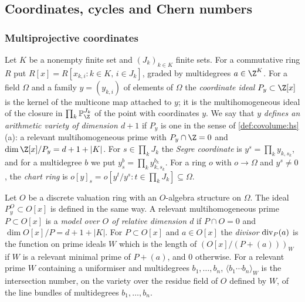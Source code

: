 \subsection{Coordinates, cycles and Chern numbers}\label{pf:towergeo:setting}

\subsubsection*{Multiprojective coordinates}
Let $K$ be a nonempty finite set and $(J_k)_{k\in K}$ finite sets. For a commutative ring $R$ put
$R[x]=R[x_{k,i}:k\in K,\,i\in J_k]$, graded by multidegrees $a\in\Z^K$. For a field $\Omega$ and a
family $y=(y_{k,i})$ of elements of $\Omega$ the \emph{coordinate ideal} $P_y\subset\Z[x]$ is the kernel
of the multicone map attached to $y$; it is the multihomogeneous ideal of the closure in
$\prod_k\mathbb P^{J_k}_\Z$ of the point with coordinates $y$. We say that $y$ \emph{defines an
arithmetic variety of dimension $d+1$} if $P_y$ is one in the sense of \cref{def:covolume:hs}(a): a
relevant multihomogeneous prime with $P_y\cap\Z=0$ and $\dim\Z[x]/P_y=d+1+|K|$. For
$s\in\prod_kJ_k$ the \emph{Segre coordinate} is $y^s=\prod_ky_{k,s_k}$, and for a multidegree $b$ we put
$y_s^b=\prod_ky_{k,s_k}^{b_k}$. For a ring $o$ with $o\to\Omega$ and $y^s\ne0$, the \emph{chart ring} is
$o[y]_s=o[y^t/y^s:t\in\prod_kJ_k]\subseteq\Omega$.

Let $O$ be a discrete valuation ring with an $O$-algebra structure on $\Omega$. The ideal
$P^O_y\subset O[x]$ is defined in the same way. A relevant multihomogeneous prime $P\subset O[x]$ is a
\emph{model over $O$ of relative dimension $d$} if $P\cap O=0$ and $\dim O[x]/P=d+1+|K|$. For
$P\subset O[x]$ and $a\in O[x]$ the \emph{divisor} $\operatorname{div}_P(a)$ is the function on prime ideals
$W$ which is the length of $(O[x]/(P+(a)))_W$ if $W$ is a relevant minimal prime of $P+(a)$, and $0$
otherwise. For a relevant prime $W$ containing a uniformiser and multidegrees $b_1,\dots,b_n$,
$\langle b_1\cdots b_n\rangle_W$ is the intersection number, on the variety over the residue field of $O$
defined by $W$, of the line bundles of multidegrees $b_1,\dots,b_n$.

